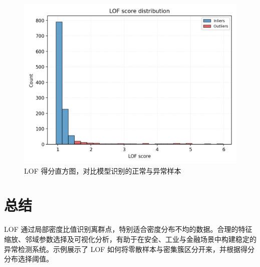 \documentclass[UTF8,zihao=-4]{ctexart}
\begin{document}
\begin{figure}[H]
  \centering
  \includegraphics[width=0.78\linewidth]{lof_score_hist.png}
  \caption{LOF 得分直方图，对比模型识别的正常与异常样本}
  \label{fig:lof_score_hist_cn}
\end{figure}

\FloatBarrier
\section{总结}
LOF 通过局部密度比值识别离群点，特别适合密度分布不均的数据。合理的特征缩放、邻域参数选择及可视化分析，有助于在安全、工业与金融场景中构建稳定的异常检测系统。示例展示了 LOF 如何将零散样本与密集簇区分开来，并根据得分分布选择阈值。
\end{document}
